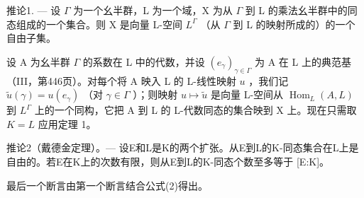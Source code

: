 推论1. — 设 \(\Gamma\) 为一个幺半群，L 为一个域，X 为从 \(\Gamma\) 到 L 的乘法幺半群中的同态组成的一个集合。则 X 是向量 L-空间 \(L^{\Gamma}\) （从 \(\Gamma\) 到 L 的映射所成的）的一个自由子集。

设 A 为幺半群 \(\Gamma\) 的系数在 L 中的代数，并设 \((e_{\gamma})_{\gamma \in \Gamma}\) 为 A 在 L 上的典范基（III，第446页）。对每个将 A 映入 L 的 L-线性映射 \(u\) ，我们记 \(\tilde{u}(\gamma) = u(e_{\gamma})\) （对 \(\gamma \in \Gamma\) ）；则映射 \(u \mapsto \tilde{u}\) 是向量 L-空间从 \(\operatorname{Hom}_{L}(A, L)\) 到 \(L^{\Gamma}\) 上的一个同构，它把 A 到 L 的 L-代数同态的集合映到 X 上。现在只需取 \(K = L\) 应用定理 1。

推论2（戴德金定理）。--- 设E和L是K的两个扩张。从E到L的K-同态集合在L上是自由的。若E在K上的次数有限，则从E到L的K-同态个数至多等于 {[}E:K{]}。

最后一个断言由第一个断言结合公式(2)得出。

